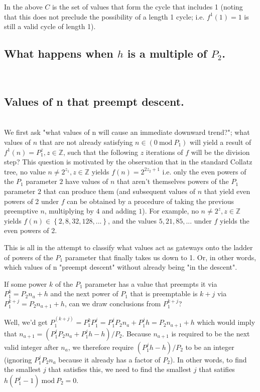 \documentclass[12pt,a4paper]{amsart}
\numberwithin{equation}{section}
\theoremstyle{plain}
\theoremstyle{definition}
\begin{document}
In the above $C$ is the set of values that form the cycle that includes 1 (noting that this does not preclude the possibility of a length 1 cycle; i.e. $f^{1} \left  ( 1 \right ) = 1$ is still a valid cycle of length 1).

\subsection{What happens when $h$ is a multiple of $P_2$.} \hfill\\



\subsection{Values of n that preempt descent.} \hfill\\

We first ask "what values of n will cause an immediate downward trend?"; what values of $n$ that are not already satisfying $n \in \left ( 0\:\mathrm{mod}\:P_{1} \right )$ will yield a result of $f^{1} \left ( n \right ) = P^{z}_{1}, z \in \mathbb{Z}$, such that the following $z$ iterations of $f$ will be the division step? This question is motivated by the observation that in the standard Collatz tree, no value $n \neq 2^{z_1}, z \in \mathbb{Z}$ yields $f \left ( n \right ) = 2^{2z_2+1}$ i.e. only the even powers of the $P_1$ parameter $2$ have values of $n$ that aren't themselves powers of the $P_1$ parameter $2$ that can produce them (and subsequent values of $n$ that yield even powers of 2 under $f$ can be obtained by a procedure of taking the previous preemptive $n$, multiplying by $4$ and adding $1$). For example, no $n \neq 2^{z}, z \in \mathbb{Z}$ yields $f \left ( n \right ) \in \left \{ 2, 8, 32, 128, ... \right \}$, and the values $5, 21, 85, ...$ under $f$ yields the even powers of 2.

This is all in the attempt to classify what values act as gateways onto the ladder of powers of the $P_1$ parameter that finally takes us down to 1. Or, in other words, which values of n "preempt descent" without already being "in the descent".

If some power $k$ of the $P_1$ parameter has a value that preempts it via $P^{k}_{1} = P_{2}n_{a} + h$ and the next power of $P_1$ that is preemptable is $k+j$ via $P^{k+j}_{1} = P_{2}n_{a+1} + h$, can we draw conclusions from $P^{k+j}_{1}$?

 Well, we'd get $P^{\left ( k+j \right )}_{1} = P^{k}_{1}P^{j}_{1} = P^{j}_{1}P_{2}n_{a} + P^{j}_{1}h = P_{2}n_{a+1} + h$ which would imply that $n_{a+1} = \left ( P^{j}_{1}P_{2}n_{a} + P^{j}_{1}h - h\right )/P_{2}$. Because $n_{a+1}$ is required to be the next valid integer after $n_a$, we therefore require $\left ( P^{j}_{1}h - h \right )/P_2$ to be an integer (ignoring $P^{j}_{1}P_{2}n_{a}$ because it already has a factor of $P_{2}$). In other words, to find the smallest $j$ that satisfies this, we need to find the smallest $j$ that satifies $h \left ( P^{j}_{1} - 1 \right )\:\mathrm{mod}\:P_{2} = 0$. 
\end{document}
